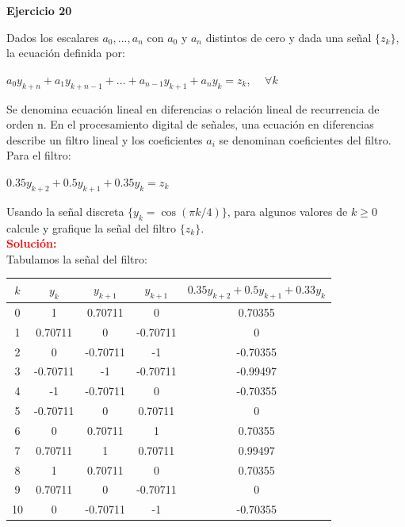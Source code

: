 \documentclass[12pt]{article}
\begin{document}
%
\noindent \textbf{Ejercicio 20}

Dados los escalares $a_0, ..., a_n$ con $a_0$ y $a_n$ distintos de cero y dada una señal $\{z_k\}$, la ecuación definida por:
\begin{center}
$a_0 y_{k+n} + a_1 y_{k+n-1} + ... + a_{n-1} y_{k+1}+a_n y_k = z_k$, $\quad \forall k$
\end{center}
Se denomina ecuación lineal en diferencias o relación lineal de recurrencia de orden n. En el procesamiento digital de señales, una ecuación en diferencias describe un filtro lineal y los coeficientes $a_i$ se denominan coeficientes del filtro. Para el filtro:
\begin{center}
    $0.35 y_{k+2} + 0.5y_{k+1} + 0.35 y_k = z_k $
\end{center}
Usando la señal discreta $\{y_k = \cos(\pi k/4)\}$, para algunos valores de $k \geq 0$ calcule y grafique la señal del filtro $\{z_k\}$.\\

\noindent \textcolor{red}{\bf Solución:}\\

Tabulamos la señal del filtro:

\begin{center}
  \begin{tabular}{ | c | c  c  c | c |}
    \hline
    $k$ & $y_{k}$ & $y_{k+1}$ & $y_{k+1}$ & $0.35y_{k+2}+0.5y_{k+1}+0.33y_{k}$\\
    \hline
    0 & 1        & 0.70711  & 0         & 0.70355   \\
    1 & 0.70711  & 0        & -0.70711  & 0         \\
    2 & 0        & -0.70711 & -1        & -0.70355  \\
    3 & -0.70711 & -1       & -0.70711  & -0.99497  \\
    4 & -1       & -0.70711 & 0         & -0.70355  \\
    5 & -0.70711 & 0        & 0.70711   & 0         \\
    6 & 0        & 0.70711  & 1         & 0.70355   \\
    7 & 0.70711  & 1        & 0.70711   & 0.99497   \\
    8 & 1        & 0.70711  & 0         & 0.70355   \\
    9 & 0.70711  & 0        & -0.70711  & 0         \\
    10 & 0       & -0.70711 & -1        & -0.70355  \\
    \hline
  \end{tabular}
\end{center}
\end{document}
